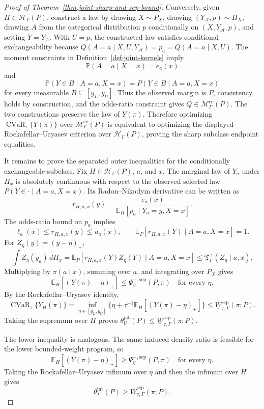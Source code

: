\documentclass[11pt]{article}
\newcommand{\E}{\mathbb{E}}
\renewcommand{\Pr}{\mathbb{P}}
\newcommand{\calH}{\mathcal{H}}
\theoremstyle{definition}
\theoremstyle{plain}
\theoremstyle{remark}
\begin{document}
\begin{proof}[Proof of Theorem~\ref{thm:joint-sharp-and-sep-bound}]
Conversely, given \(H\in\calH_\Gamma(P)\), construct a law by drawing
\(X\sim P_X\), drawing \((Y_{\mathcal A},p)\sim H_X\), drawing
\(A\) from the categorical distribution \(p\) conditionally on
\((X,Y_{\mathcal A},p)\), and setting \(Y=Y_A\).  With \(U=p\), the constructed
law satisfies conditional exchangeability because
\(Q(A=a\mid X,U,Y_{\mathcal A})=p_a=Q(A=a\mid X,U)\).  The moment constraints in
Definition~\ref{def:joint-kernels} imply
\[
\Pr(A=a\mid X=x)=e_a(x)
\]
and
\[
\Pr(Y\in B\mid A=a,X=x)=P(Y\in B\mid A=a,X=x)
\]
for every measurable \(B\subseteq[y_L,y_U]\).  Thus the observed margin is
\(P\), consistency holds by construction, and the odds-ratio constraint gives
\(Q\in\mathcal M_\Gamma^{\mathrm{ce}}(P)\).  The two constructions preserve the
law of \(Y(\pi)\).  Therefore optimizing
\(\operatorname{CVaR}_{\tau}\{Y(\pi)\}\) over
\(\mathcal M_\Gamma^{\mathrm{ce}}(P)\) is equivalent to optimizing the displayed
Rockafellar--Uryasev criterion over \(\calH_\Gamma(P)\), proving the sharp
subclass endpoint equalities.

It remains to prove the separated outer inequalities for the conditionally
exchangeable subclass.  Fix \(H\in\calH_\Gamma(P)\), \(a\), and \(x\).  The
marginal law of \(Y_a\) under \(H_x\) is absolutely continuous with respect to
the observed selected law \(P(Y\in\cdot\mid A=a,X=x)\).  Its Radon--Nikodym
derivative can be written as
\[
r_{H,a,x}(y)
=
\frac{e_a(x)}
{\E_H[p_a\mid Y_a=y,X=x]}.
\]
The odds-ratio bound on \(p_a\) implies
\[
\ell_a(x)\le r_{H,a,x}(y)\le u_a(x),
\qquad
\E_P[r_{H,a,x}(Y)\mid A=a,X=x]=1.
\]
For \(Z_\eta(y)=(y-\eta)_+\),
\[
\int Z_\eta(y_a)\,dH_x
=
\E_P[r_{H,a,x}(Y)Z_\eta(Y)\mid A=a,X=x]
\le
\mathfrak T_\Gamma^+(Z_\eta\mid a,x).
\]
Multiplying by \(\pi(a\mid x)\), summing over \(a\), and integrating over
\(P_X\) gives
\[
\E_H[(Y(\pi)-\eta)_+]
\le
\Psi_\eta^{+,\mathrm{sep}}(P,\pi)
\quad\text{for every }\eta.
\]
By the Rockafellar--Uryasev identity,
\[
\operatorname{CVaR}_{\tau}\{Y_H(\pi)\}
=
\inf_{\eta\in[y_L,y_U]}
\{\eta+\tau^{-1}\E_H[(Y(\pi)-\eta)_+]\}
\le
\underline W_{\tau,\Gamma}^{\mathrm{sep}}(\pi;P).
\]
Taking the supremum over \(H\) proves
\(\theta_U^{\mathrm{jnt}}(P)\le
\underline W_{\tau,\Gamma}^{\mathrm{sep}}(\pi;P)\).

The lower inequality is analogous.  The same induced density ratio is feasible
for the lower bounded-weight program, so
\[
\E_H[(Y(\pi)-\eta)_+]\ge
\Psi_\eta^{-,\mathrm{sep}}(P,\pi)
\quad\text{for every }\eta.
\]
Taking the Rockafellar--Uryasev infimum over \(\eta\) and then the infimum over
\(H\) gives
\[
\theta_L^{\mathrm{jnt}}(P)
\ge
\overline W_{\tau,\Gamma}^{\mathrm{sep}}(\pi;P).
\]


\end{proof}
\end{document}
